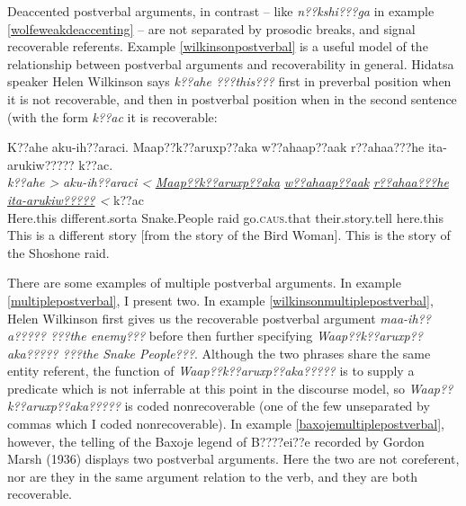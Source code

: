 \documentclass[output=paper]{LSP/langsci}
\begin{document}
Deaccented postverbal arguments, in contrast -- like \emph{n??kshi???ga} in example \ref{wolfeweakdeaccenting} -- are not separated by prosodic breaks, and signal recoverable referents. Example \ref{wilkinsonpostverbal} is a useful model of the relationship between postverbal arguments and recoverability in general. Hidatsa speaker Helen Wilkinson says \emph{k??ahe ???this???} first in preverbal position when it is not recoverable, and then in postverbal position when in the second sentence (with the form \emph{k??ac} it is recoverable:

\ea\label{wilkinsonpostverbal}
K??ahe aku-ih??araci. Maap??k??aruxp??aka w??ahaap??aak r??ahaa???he ita-arukiw????? k??ac.\footnotemark\\
\gll	\emph{k??ahe >}	\emph{aku-ih??araci <}	\emph{\underline{Maap??k??aruxp??aka}} 	\emph{\underline{w??ahaap??aak}} 	\emph{\underline{r??ahaa???he}}			\emph{\underline{ita-arukiw?????} <}		k??ac\\
	Here.this 		different.sorta		Snake.People 					raid 						go.\textsc{caus}.that 				their.story.tell 					here.this\\
\glt	This is a different story [from the story of the Bird Woman]. This is the story of the Shoshone raid.
\z

There are some examples of multiple postverbal arguments. In example \ref{multiplepostverbal}, I present two. In example \ref{wilkinsonmultiplepostverbal}, Helen Wilkinson first gives us the recoverable postverbal argument \emph{maa-ih??a????? ???the enemy???} before then further specifying \emph{Waap??k??aruxp??aka????? ???the Snake People???}. Although the two phrases share the same entity referent, the function of \emph{Waap??k??aruxp??aka?????} is to supply a predicate which is not inferrable at this point in the discourse model, so \emph{Waap??k??aruxp??aka?????} is coded nonrecoverable (one of the few unseparated by commas which I coded nonrecoverable). In example \ref{baxojemultiplepostverbal}, however, the telling of the Baxoje legend of B????ei??e recorded by Gordon Marsh (1936) displays two postverbal arguments. Here the two are not coreferent, nor are they in the same argument relation to the verb, and they are both recoverable. 
\end{document}
